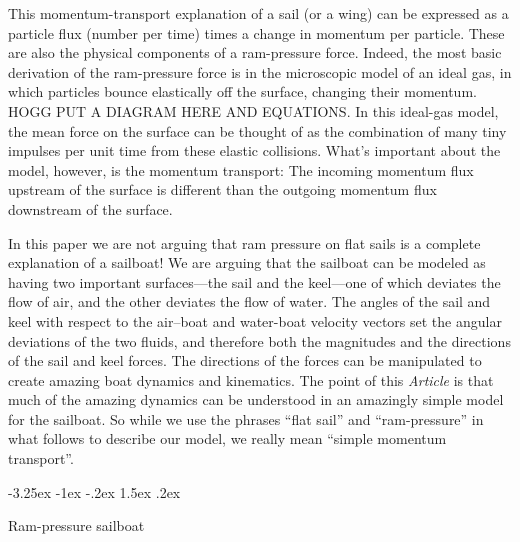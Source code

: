 \documentclass[letterpaper]{article}
\makeatletter
\newcommand{\documentname}{\textsl{Article}}
\renewcommand\section{\@startsection {section}{1}{\z@}%
  {-3.25ex \@plus -1ex \@minus -.2ex}%
  {1.5ex \@plus .2ex}%
  {\raggedright\normalfont\large\bfseries}}
\makeatother
\begin{document}
This momentum-transport explanation of a sail (or a wing) 
can be expressed as a particle flux (number per time) times a change in momentum per particle.
These are also the physical components of a ram-pressure force.
Indeed, the most basic derivation of the ram-pressure force is in the microscopic model of an ideal gas, in which particles bounce elastically off the surface, changing their momentum.
HOGG PUT A DIAGRAM HERE AND EQUATIONS.
In this ideal-gas model, the mean force on the surface can be thought of as the combination of many tiny impulses per unit time from these elastic collisions.
What's important about the model, however, is the momentum transport:
The incoming momentum flux upstream of the surface is different than the outgoing momentum flux downstream of the surface.

In this paper we are not arguing that ram pressure on flat sails is a complete explanation of a sailboat!
We are arguing that the sailboat can be modeled as having two important surfaces---the sail and the keel---one of which deviates the flow of air, and the other deviates the flow of water.
The angles of the sail and keel with respect to the air--boat and water-boat velocity vectors set the angular deviations of the two fluids, and therefore both the magnitudes and the directions of the sail and keel forces.
The directions of the forces can be manipulated to create amazing boat dynamics and kinematics.
The point of this \documentname{} is that much of the amazing dynamics can be understood in an amazingly simple model for the sailboat.
So while we use the phrases ``flat sail'' and ``ram-pressure'' in what follows to describe our model, we really mean ``simple momentum transport''.

\section{Ram-pressure sailboat}\label{sec:model}
\end{document}
